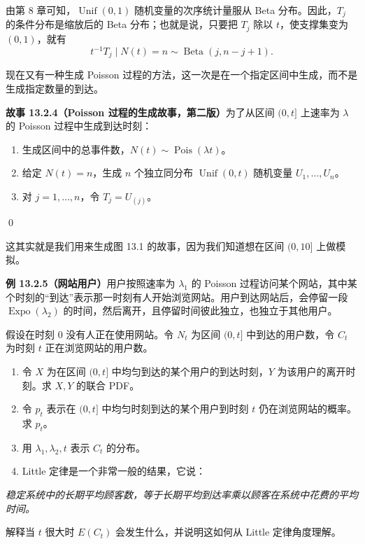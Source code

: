 \documentclass[UTF8, 12pt, fontset=fandol, oneside]{ctexart}
\begin{document}
由第 8 章可知，$\operatorname{Unif}(0,1)$ 随机变量的次序统计量服从 Beta 分布。因此，$T_j$ 的条件分布是缩放后的 Beta 分布；也就是说，只要把 $T_j$ 除以 $t$，使支撑集变为 $(0,1)$，就有
\[
  t^{-1}T_j\mid N(t)=n \sim \operatorname{Beta}(j,n-j+1).
\]

现在又有一种生成 Poisson 过程的方法，这一次是在一个指定区间中生成，而不是生成指定数量的到达。

\noindent\textbf{故事 13.2.4（Poisson 过程的生成故事，第二版）}\quad 为了从区间 $(0,t]$ 上速率为 $\lambda$ 的 Poisson 过程中生成到达时刻：
\begin{enumerate}
  \item 生成区间中的总事件数，$N(t)\sim\operatorname{Pois}(\lambda t)$。
  \item 给定 $N(t)=n$，生成 $n$ 个独立同分布 $\operatorname{Unif}(0,t)$ 随机变量 $U_1,\ldots,U_n$。
  \item 对 $j=1,\ldots,n$，令 $T_j=U_{(j)}$。
\end{enumerate}
\qed

这其实就是我们用来生成图 13.1 的故事，因为我们知道想在区间 $(0,10]$ 上做模拟。

\noindent\textbf{例 13.2.5（网站用户）}\quad 用户按照速率为 $\lambda_1$ 的 Poisson 过程访问某个网站，其中某个时刻的“到达”表示那一时刻有人开始浏览网站。用户到达网站后，会停留一段 $\operatorname{Expo}(\lambda_2)$ 的时间，然后离开，且停留时间彼此独立，也独立于其他用户。

假设在时刻 $0$ 没有人正在使用网站。令 $N_t$ 为区间 $(0,t]$ 中到达的用户数，令 $C_t$ 为时刻 $t$ 正在浏览网站的用户数。

\begin{enumerate}
  \item 令 $X$ 为在区间 $(0,t]$ 中均匀到达的某个用户的到达时刻，$Y$ 为该用户的离开时刻。求 $X,Y$ 的联合 PDF。
  \item 令 $p_t$ 表示在 $(0,t]$ 中均匀时刻到达的某个用户到时刻 $t$ 仍在浏览网站的概率。求 $p_t$。
  \item 用 $\lambda_1,\lambda_2,t$ 表示 $C_t$ 的分布。
  \item Little 定律是一个非常一般的结果，它说：
\end{enumerate}

\noindent\textit{稳定系统中的长期平均顾客数，等于长期平均到达率乘以顾客在系统中花费的平均时间。}

解释当 $t$ 很大时 $E(C_t)$ 会发生什么，并说明这如何从 Little 定律角度理解。
\end{document}
